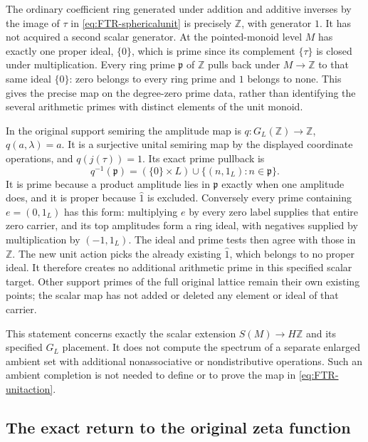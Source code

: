 The ordinary coefficient ring generated under addition and
additive inverses by the image of $\tau$ in
\eqref{eq:FTR-sphericalunit} is precisely $\mathbb Z$, with
generator $1$. It has not acquired a second scalar generator.
At the pointed-monoid level $M$ has exactly one proper ideal,
$\{0\}$, which is prime since its complement $\{\tau\}$
is closed under multiplication. Every ring prime $\mathfrak p$
of $\mathbb Z$ pulls back under $M\to\mathbb Z$ to that same
ideal $\{0\}$: zero belongs to every ring prime and $1$
belongs to none. This gives the precise map on the degree-zero
prime data, rather than identifying the several arithmetic
primes with distinct elements of the unit monoid.

In the original support semiring the amplitude map is
$q:G_L(\mathbb Z)\to\mathbb Z$, $q(a,\lambda)=a$.
It is a surjective unital semiring map by the displayed
coordinate operations, and $q(j(\tau))=1$. Its exact prime
pullback is
\begin{equation}\tag{FTR24}\label{eq:FTR-arithmeticprimes}
 q^{-1}(\mathfrak p)
   =(\{0\}\times L)
            \cup\{(n,1_L):n\in\mathfrak p\}.
\end{equation}
It is prime because a product amplitude lies in $\mathfrak p$
exactly when one amplitude does, and it is proper because
$\widehat1$ is excluded. Conversely every prime containing
$e=(0,1_L)$ has this form: multiplying $e$ by every zero
label supplies that entire zero carrier, and its top amplitudes
form a ring ideal, with negatives supplied by multiplication
by $(-1,1_L)$. The ideal and prime tests then agree with
those in $\mathbb Z$.
The new unit action picks the already existing $\widehat1$,
which belongs to no proper ideal. It therefore creates no
additional arithmetic prime in this specified scalar target.
Other support primes of the full original lattice remain their
own existing points; the scalar map has not added or deleted
any element or ideal of that carrier.

This statement concerns exactly the scalar extension
$S(M)\to H\mathbb Z$ and its specified $G_L$ placement.
It does not compute the spectrum of a separate enlarged
ambient set with additional nonassociative or nondistributive
operations. Such an ambient completion is not needed to define
or to prove the map in \eqref{eq:FTR-unitaction}.

\subsection{The exact return to the original zeta function}

